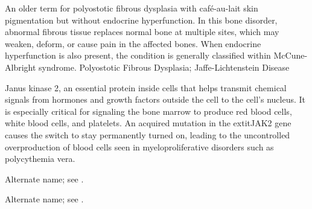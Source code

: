  An older term for polyostotic fibrous dysplasia with café-au-lait skin pigmentation but without endocrine hyperfunction. In this bone disorder, abnormal fibrous tissue replaces normal bone at multiple sites, which may weaken, deform, or cause pain in the affected bones. When endocrine hyperfunction is also present, the condition is generally classified within McCune-Albright syndrome.
\synonyms
Polyostotic Fibrous Dysplasia; Jaffe-Lichtenstein Disease

 Janus kinase 2, an essential protein inside cells that helps transmit chemical signals from hormones and growth factors outside the cell to the cell's nucleus. It is especially critical for signaling the bone marrow to produce red blood cells, white blood cells, and platelets. An acquired mutation in the  extit{JAK2} gene causes the switch to stay permanently turned on, leading to the uncontrolled overproduction of blood cells seen in myeloproliferative disorders such as polycythemia vera.

 Alternate name; see .

 Alternate name; see .

